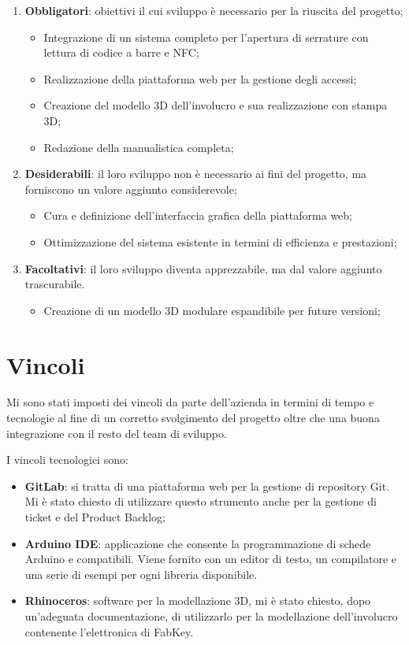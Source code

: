 \begin{enumerate}
\item \textbf{Obbligatori}: obiettivi il cui sviluppo è necessario per la riuscita del progetto;
\begin{itemize}
\item Integrazione di un sistema completo per l'apertura di serrature con lettura di codice a barre e NFC; 
\item Realizzazione della piattaforma web per la gestione degli accessi; 
\item Creazione del modello 3D dell'involucro e sua realizzazione con stampa 3D; 
\item Redazione della manualistica completa; 
\end{itemize}
\item \textbf{Desiderabili}: il loro sviluppo non è necessario ai fini del progetto, ma forniscono un valore aggiunto considerevole;
\begin{itemize}
\item Cura e definizione dell'interfaccia grafica della piattaforma web;
\item Ottimizzazione del sistema esistente in termini di efficienza e prestazioni; 
\end{itemize}
\item \textbf{Facoltativi}: il loro sviluppo diventa apprezzabile, ma dal valore aggiunto trascurabile.
\begin{itemize}
\item Creazione di un modello 3D modulare espandibile per future versioni; 
\end{itemize}
\end{enumerate}

\section{Vincoli}
Mi sono stati imposti dei vincoli da parte dell'azienda in termini di tempo e tecnologie al fine di un corretto svolgimento del progetto oltre che una buona integrazione con il resto del team di sviluppo.

I vincoli tecnologici sono:
\begin{itemize}
\item \textbf{GitLab}: si tratta di una piattaforma web per la gestione di repository Git. Mi è stato chiesto di utilizzare questo strumento anche per la gestione di ticket e del Product Backlog;
\item \textbf{Arduino IDE}: applicazione che consente la programmazione di schede Arduino e compatibili. Viene fornito con un editor di testo, un compilatore e una serie di esempi per ogni libreria disponibile.
\item \textbf{Rhinoceros}: software per la modellazione 3D, mi è stato chiesto, dopo un'adeguata documentazione, di utilizzarlo per la modellazione dell'involucro contenente l'elettronica di FabKey.
\end{itemize}

